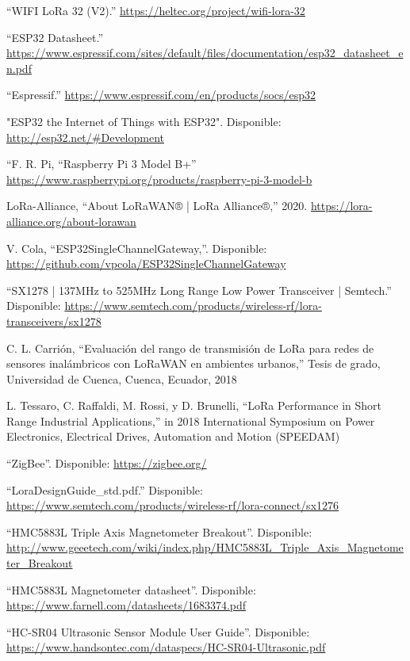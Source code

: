 \begin{references}
    “WIFI LoRa 32 (V2).” \url{https://heltec.org/project/wifi-lora-32}

    “ESP32 Datasheet.” \url{https://www.espressif.com/sites/default/files/documentation/esp32_datasheet_en.pdf}

    “Espressif.” \url{https://www.espressif.com/en/products/socs/esp32}

    "ESP32 the Internet of Things with ESP32". Disponible: \url{http://esp32.net/#Development}

    “F. R. Pi, “Raspberry Pi 3 Model B+” \url{https://www.raspberrypi.org/products/raspberry-pi-3-model-b}
    
    LoRa-Alliance, “About LoRaWAN® | LoRa Alliance®,” 2020. \url{https://lora-alliance.org/about-lorawan}

    V. Cola, “ESP32SingleChannelGateway,”. Disponible: \url{https://github.com/vpcola/ESP32SingleChannelGateway}

    “SX1278 | 137MHz to 525MHz Long Range Low Power Transceiver | Semtech.” Disponible: \url{https://www.semtech.com/products/wireless-rf/lora-transceivers/sx1278}

    C. L. Carrión, “Evaluación del rango de transmisión de LoRa para redes de sensores inalámbricos con LoRaWAN en ambientes urbanos,” Tesis de grado, Universidad de Cuenca, Cuenca, Ecuador, 2018

    L. Tessaro, C. Raffaldi, M. Rossi, y D. Brunelli, “LoRa Performance in Short Range Industrial Applications,” in 2018 International Symposium on Power Electronics, Electrical Drives, Automation and Motion (SPEEDAM)

    “ZigBee”. Disponible: \url{https://zigbee.org/}

    “LoraDesignGuide\_std.pdf.” Disponible: \url{https://www.semtech.com/products/wireless-rf/lora-connect/sx1276}

    “HMC5883L Triple Axis Magnetometer Breakout”. Disponible: \url{http://www.geeetech.com/wiki/index.php/HMC5883L_Triple_Axis_Magnetometer_Breakout}

    “HMC5883L Magnetometer datasheet”. Disponible: \url{https://www.farnell.com/datasheets/1683374.pdf}

    “HC-SR04 Ultrasonic Sensor Module User Guide”. Disponible: \url{https://www.handsontec.com/dataspecs/HC-SR04-Ultrasonic.pdf}


\end{references}
